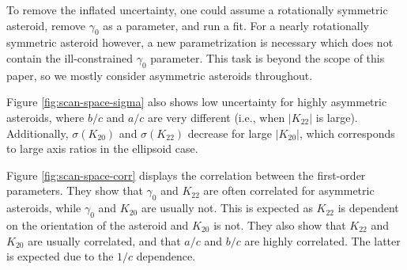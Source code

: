 \documentclass[fleqn,usenatbib]{mnras}
\begin{document}
To remove the inflated uncertainty, one could assume a rotationally symmetric asteroid, remove $\gamma_0$ as a parameter, and run a fit. For a nearly rotationally symmetric asteroid however, a new parametrization is necessary which does not contain the ill-constrained $\gamma_0$ parameter. This task is beyond the scope of this paper, so we mostly consider asymmetric asteroids throughout.

Figure \ref{fig:scan-space-sigma} also shows low uncertainty for highly asymmetric asteroids, where $b/c$ and $a/c$ are very different (i.e., when $|K_{22}|$ is large). Additionally, $\sigma(K_{20})$ and $\sigma(K_{22})$ decrease for large $|K_{20}|$, which corresponds to large axis ratios in the ellipsoid case.

Figure \ref{fig:scan-space-corr} displays the correlation between the first-order parameters. They show that $\gamma_0$ and $K_{22}$ are often correlated for asymmetric asteroids, while $\gamma_0$ and $K_{20}$ are usually not. This is expected as $K_{22}$ is dependent on the orientation of the asteroid and $K_{20}$ is not. They also show that $K_{22}$ and $K_{20}$ are usually correlated, and that $a/c$ and $b/c$ are highly correlated. The latter is expected due to the $1/c$ dependence.
\end{document}
